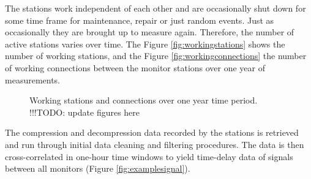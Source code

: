 \documentclass[12pt,a4paper,english]{article}
\newcommand\todo[1]{{\color{red}!!!TODO: #1}}
\begin{document}
The stations work independent of each other and are occasionally shut down for some time frame for maintenance, repair or just random events. Just as occasionally they are brought up to measure again.  Therefore, the number of active stations varies over time. The Figure \ref{fig:workingstations} shows the number of working stations, and the Figure \ref{fig:workingconnections} the number of working connections between the monitor stations over one year of measurements. 

\begin{figure}[ht] 
  \centering 
{}
\caption{Working stations and connections over one year time period. \todo{update figures here}}
\label{fig:workingmonitors}
\end{figure}

The compression and decompression data recorded by the stations is retrieved and run through initial data cleaning and filtering procedures. The data is then cross-correlated in one-hour time windows to yield time-delay data of signals between all monitors (Figure \ref{fig:examplesignal}). 

\end{document}

